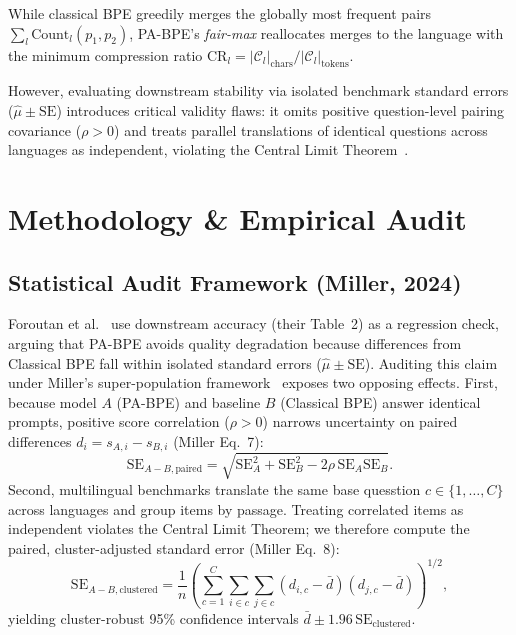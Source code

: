\documentclass[sigconf,nonacm]{acmart}
\begin{document}
While classical BPE greedily merges the globally most frequent pairs $\sum_l \mathrm{Count}_l(p_1, p_2)$, PA-BPE's \textit{fair-max} reallocates merges to the language with the minimum compression ratio $\mathrm{CR}_l = |\mathcal{C}_l|_{\mathrm{chars}} / |\mathcal{C}_l|_{\mathrm{tokens}}$.

However, evaluating downstream stability via isolated benchmark standard errors ($\hat{\mu} \pm \mathrm{SE}$) introduces critical validity flaws: it omits positive question-level pairing covariance ($\rho > 0$) and treats parallel translations of identical questions across languages as independent, violating the Central Limit Theorem~\cite{miller2024adding}.

\section{Methodology \& Empirical Audit}

\subsection{Statistical Audit Framework (Miller, 2024)}
\label{sec:stat_methodology}

Foroutan et al.~\cite{foroutan2026parity} use downstream accuracy (their Table~2) as a regression check, arguing that PA-BPE avoids quality degradation because differences from Classical BPE fall within isolated standard errors ($\hat{\mu} \pm \mathrm{SE}$). Auditing this claim under Miller's super-population framework~\cite{miller2024adding} exposes two opposing effects. First, because model $A$ (PA-BPE) and baseline $B$ (Classical BPE) answer identical prompts, positive score correlation ($\rho > 0$) narrows uncertainty on paired differences $d_i = s_{A,i} - s_{B,i}$ (Miller Eq.~7):
\begin{equation}
\mathrm{SE}_{A-B,\mathrm{paired}} = \sqrt{\mathrm{SE}_A^2 + \mathrm{SE}_B^2 - 2\rho\,\mathrm{SE}_A\mathrm{SE}_B}.
\label{eq:paired_se}
\end{equation}
Second, multilingual benchmarks translate the same base quesstion $c \in \{1,\dots,C\}$ across languages and group items by passage. Treating correlated items as independent violates the Central Limit Theorem; we therefore compute the paired, cluster-adjusted standard error (Miller Eq.~8):
\begin{equation}
\mathrm{SE}_{A-B,\mathrm{clustered}} = \frac{1}{n}\left(\sum_{c=1}^{C}\sum_{i \in c}\sum_{j \in c}(d_{i,c} - \bar{d})(d_{j,c} - \bar{d})\right)^{\!1/2}\!\!,
\label{eq:clustered_se}
\end{equation}
yielding cluster-robust 95\% confidence intervals $\bar{d} \pm 1.96\,\mathrm{SE}_{\mathrm{clustered}}$.
\end{document}
